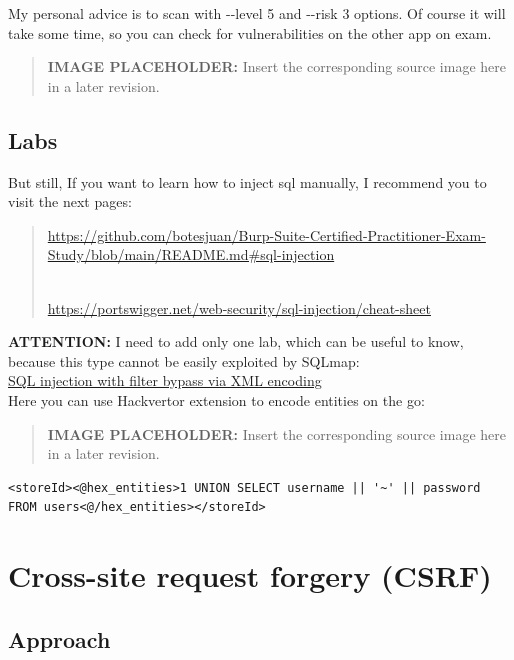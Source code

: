 \documentclass[
  letterpaper,
]{article}
\begin{document}
My personal advice is to scan with -\/-level 5 and -\/-risk 3 options.
Of course it will take some time, so you can check for vulnerabilities
on the other app on exam.\\
\begin{quote}
\textbf{IMAGE PLACEHOLDER:} Insert the corresponding source image here in a later revision.
\end{quote}
\subsection{Labs}\label{labs-1}

But still, If you want to learn how to inject sql manually, I recommend
you to visit the next pages:

\begin{quote}
\url{https://github.com/botesjuan/Burp-Suite-Certified-Practitioner-Exam-Study/blob/main/README.md\#sql-injection}\strut \\
\url{https://portswigger.net/web-security/sql-injection/cheat-sheet}
\end{quote}

\textbf{ATTENTION:} I need to add only one lab, which can be useful to
know, because this type cannot be easily exploited by SQLmap:\\
\href{https://portswigger.net/web-security/sql-injection/lab-sql-injection-with-filter-bypass-via-xml-encoding}{SQL
injection with filter bypass via XML encoding}\\
Here you can use Hackvertor extension to encode entities on the go:\\
\begin{quote}
\textbf{IMAGE PLACEHOLDER:} Insert the corresponding source image here in a later revision.
\end{quote}
\begin{Verbatim}[breaklines,breakanywhere,fontsize=\small]
<storeId><@hex_entities>1 UNION SELECT username || '~' || password FROM users<@/hex_entities></storeId>
\end{Verbatim}

\section{Cross-site request forgery
(CSRF)}\label{cross-site-request-forgery-csrf}

\subsection{Approach}\label{approach-2}
\end{document}
